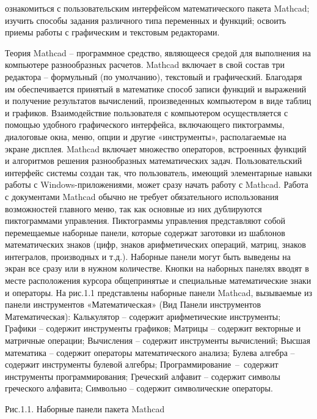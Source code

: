 
\goal ознакомиться с пользовательским интерфейсом математического пакета Mathcad; изучить способы задания различного типа переменных и функций; освоить приемы работы с графическим и текстовым редакторами.

Теория
Mathcad – программное средство, являющееся средой для выполнения на компьютере разнообразных расчетов. Mathcad включает в свой состав три редактора – формульный (по умолчанию), текстовый и графический. Благодаря им обеспечивается принятый в математике способ записи функций и выражений и получение результатов вычислений, произведенных компьютером в виде таблиц и графиков. Взаимодействие пользователя с компьютером осуществляется с помощью удобного графического интерфейса, включающего пиктограммы, диалоговые окна, меню, опции и другие «инструменты», располагаемые на экране дисплея. Mathcad включает множество операторов, встроенных функций и алгоритмов решения разнообразных математических задач.
Пользовательский интерфейс системы создан так, что пользователь, имеющий элементарные навыки работы с Windows-приложениями, может сразу начать работу с Mathcad. Работа с документами Mathcad обычно не требует обязательного использования возможностей главного меню, так как основные из них дублируются пиктограммами управления. Пиктограммы управления представляют собой перемещаемые наборные панели, которые содержат заготовки из шаблонов математических знаков (цифр, знаков арифметических операций, матриц, знаков интегралов, производных и т.д.). Наборные панели могут быть выведены на экран все сразу или в нужном количестве. Кнопки на наборных панелях вводят в месте расположения курсора общепринятые и специальные математические знаки и операторы. На рис.1.1 представлены наборные панели Mathcad, вызываемые из панели инструментов «Математическая» (Вид  Панели инструментов  Математическая):
Калькулятор – содержит арифметические инструменты;
Графики – содержит инструменты графиков;
Матрицы – содержит векторные и матричные операции;
Вычисления – содержит инструменты вычислений;
Высшая математика – содержит операторы математического анализа;
Булева алгебра – содержит инструменты булевой алгебры;
Программирование – содержит инструменты программирования;
Греческий алфавит – содержит символы греческого алфавита;
Символьно – содержит символические операторы.


Рис.1.1. Наборные панели пакета Mathcad

